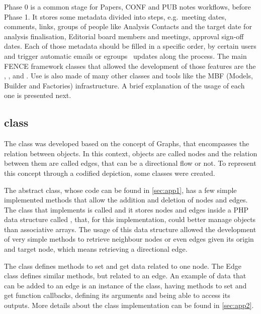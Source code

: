Phase 0 is a common stage for Papers, CONF and PUB notes workflows, before Phase 1.
It stores some metadata divided into steps, e.g.\ meeting dates, comments, links, groups of people like Analysis Contacts and the target date for analysis finalisation, Editorial board members and meetings, approval sign-off dates.
Each of those metadata should be filled in a specific order, by certain users and trigger automatic emails or egroups~\cite{egroups} updates along the process.
The main FENCE framework classes that allowed the development of those features are the , ,  and .
Use is also made of many other classes and tools like the MBF (Models, Builder and Factories) infrastructure.
A brief explanation of the usage of each one is presented next.

\subsection{ class}
\label{sec:Workflow_class}

The  class was developed based on the concept of Graphs, that encompasses the relation between objects. In this context, objects are called nodes and the relation between them are called edges, that can be a directional flow or not. To represent this concept through a codified depiction, some classes were created. 

The abstract  class, whose code can be found in \cref{sec:app1}, has a few simple implemented methods that allow the addition and deletion of nodes and edges.
The class that implements  is called  and it stores nodes and edges inside a PHP data structure called , that, for this implementation, could better manage objects than associative arrays.
The usage of this data structure allowed the development of very simple methods to retrieve neighbour nodes or even edges given its origin and target node, which means retrieving a directional edge.

The  class defines methods to set and get data related to one node. The Edge class defines similar methods, but related to an edge. An example of data that can be added to an edge is an instance of the  class, having methods to set and get function callbacks, defining its arguments and being able to access its outputs.
More details about the  class implementation can be found in \cref{sec:app2}.

